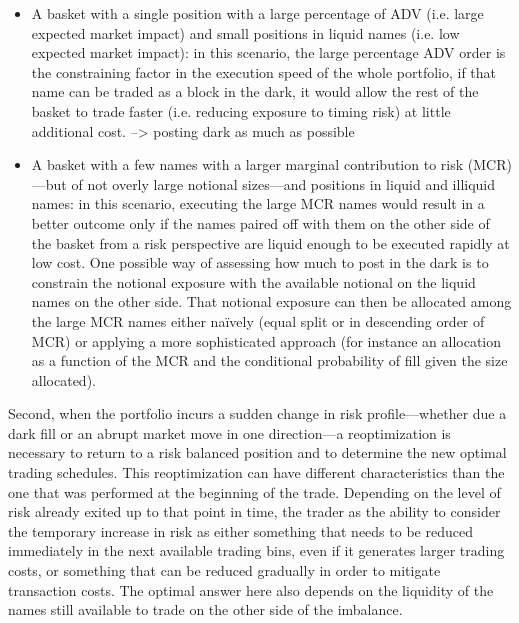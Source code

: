 \begin{itemize}
\item A basket with a single position with a large percentage of ADV (i.e. large expected market impact) and small positions in liquid names (i.e. low expected market impact): in this scenario, the large percentage ADV order is the constraining factor in the execution speed of the whole portfolio, if that name can be traded as a block in the dark, it would allow the rest of the basket to trade faster (i.e. reducing exposure to timing risk) at little additional cost. --> posting dark as much as possible

\item A basket with a few names with a larger marginal contribution to risk (MCR)---but of not overly large notional sizes---and positions in liquid and illiquid names: in this scenario, executing the large MCR names would result in a better outcome only if the names paired off with them on the other side of the basket from a risk perspective are liquid enough to be executed rapidly at low cost. One possible way of assessing how much to post in the dark is to constrain the notional exposure with the available notional on the liquid names on the other side. That notional exposure can then be allocated among the large MCR names either na\"ively (equal split or in descending order of MCR) or applying a more sophisticated approach (for instance an allocation as a function of the MCR and the conditional probability of fill given the size allocated).
\end{itemize}


Second, when the portfolio incurs a sudden change in risk profile---whether due a dark fill or an abrupt market move in one direction---a reoptimization is necessary to return to a risk balanced position and to determine the new optimal trading schedules. This reoptimization can have different characteristics than the one that was performed at the beginning of the trade. Depending on the level of risk already exited up to that point in time, the trader as the ability to consider the temporary increase in risk as either something that needs to be reduced immediately in the next available trading bins, even if it generates larger trading costs, or something that can be reduced gradually in order to mitigate transaction costs. The optimal answer here also depends on the liquidity of the names still available to trade on the other side of the imbalance. \twomedskip


